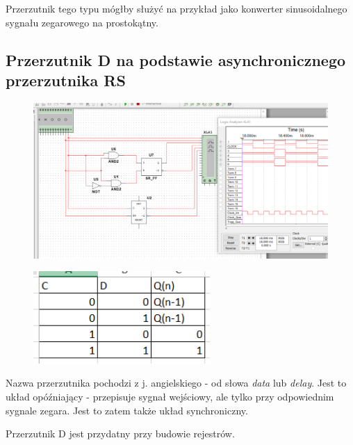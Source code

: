 \documentclass[12pt,a4paper]{article}
\begin{document}
Przerzutnik tego typu mógłby służyć na przykład jako konwerter sinusoidalnego sygnału zegarowego na prostokątny.


\subsection{Przerzutnik D na podstawie asynchronicznego przerzutnika RS}
\begin{figure}[H]
\centering
\includegraphics[width=\textwidth]{img/3d}
\end{figure}
\begin{figure}[H]
\centering
\includegraphics[width=0.6\textwidth]{img/3dTruthTable}
\end{figure}

Nazwa przerzutnika pochodzi z j. angielskiego - od słowa \textit{data} lub \textit{delay}. Jest to układ opóźniający - przepisuje sygnał wejściowy, ale tylko przy odpowiednim sygnale zegara. Jest to zatem także układ synchroniczny.

Przerzutnik D jest przydatny przy budowie rejestrów.
\end{document}
